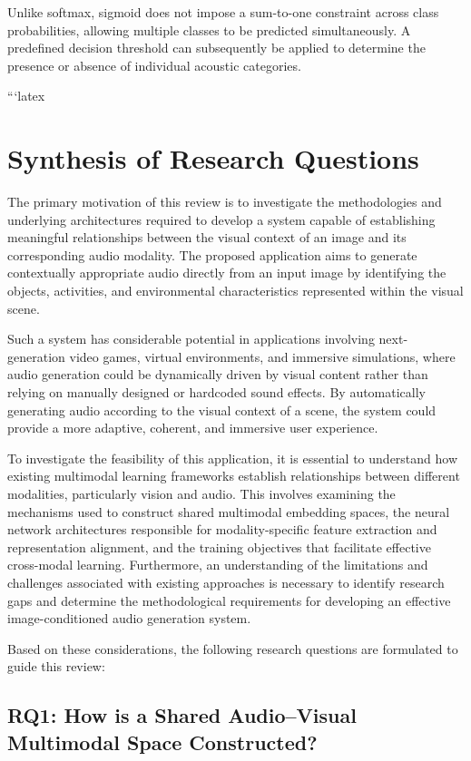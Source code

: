 \documentclass[pdflatex,sn-mathphys-num]{sn-jnl}%
\theoremstyle{thmstyleone}%
\theoremstyle{thmstyletwo}%
\theoremstyle{thmstylethree}%
\begin{document}
Unlike softmax, sigmoid does not impose a sum-to-one constraint across class probabilities, allowing multiple classes to be predicted simultaneously. A predefined decision threshold can subsequently be applied to determine the presence or absence of individual acoustic categories.

```latex
\section{Synthesis of Research Questions}\label{sec5}

The primary motivation of this review is to investigate the methodologies and underlying architectures required to develop a system capable of establishing meaningful relationships between the visual context of an image and its corresponding audio modality. The proposed application aims to generate contextually appropriate audio directly from an input image by identifying the objects, activities, and environmental characteristics represented within the visual scene.

Such a system has considerable potential in applications involving next-generation video games, virtual environments, and immersive simulations, where audio generation could be dynamically driven by visual content rather than relying on manually designed or hardcoded sound effects. By automatically generating audio according to the visual context of a scene, the system could provide a more adaptive, coherent, and immersive user experience.

To investigate the feasibility of this application, it is essential to understand how existing multimodal learning frameworks establish relationships between different modalities, particularly vision and audio. This involves examining the mechanisms used to construct shared multimodal embedding spaces, the neural network architectures responsible for modality-specific feature extraction and representation alignment, and the training objectives that facilitate effective cross-modal learning. Furthermore, an understanding of the limitations and challenges associated with existing approaches is necessary to identify research gaps and determine the methodological requirements for developing an effective image-conditioned audio generation system.

Based on these considerations, the following research questions are formulated to guide this review:

\subsection{RQ1: How is a Shared Audio--Visual Multimodal Space Constructed?}
\end{document}
